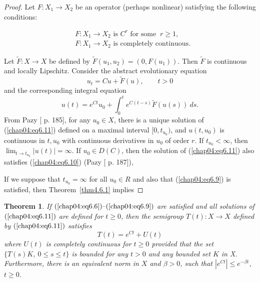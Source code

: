 \documentclass{surv-l}
\theoremstyle{plain}
\newtheorem{theorem}{Theorem}[section]
\theoremstyle{definition}
\numberwithin{equation}{section}
\numberwithin{figure}{chapter}
\begin{document}
\begin{proof}
Let $F\!:X_{1}\rightarrow X_{2}$ be an operator (perhaps nonlinear) satisfying the following conditions:

\begin{align}
\label{chap04:eq6.8}&F:X_{1}\rightarrow X_{2} \text{ is } C^{r} \text{ for some }\ r\geq 1,\\
\label{chap04:eq6.9}
&F:X_{1}\rightarrow X_{2} \text{ is  completely continuous}.
\end{align}

Let $\tilde{F}\!:X\rightarrow X$ be defined by $\tilde{F}(u_{1}, u_{2})=(0, F(u_{1}))$. Then $\tilde{F}$ is continuous and locally Lipschitz. Consider the abstract evolutionary equation
\begin{equation}\label{chap04:eq6.10}
u_{t}=Cu+\tilde{F}(u),\qquad t>0
\end{equation}
and the corresponding integral equation
\begin{equation}\label{chap04:eq6.11}
u(t)=e^{Ct}u_{0}+\int_{0}^{t}e^{C(t-s)}\tilde{F}(u(s))\ ds.
\end{equation}
From Pazy [\citeyear{1983p} p. 185], for any $u_{0}\in X$, there is a unique solution of (\ref{chap04:eq6.11}) defined on a maximal interval $[0, t_{u_{0}})$, and $u(t, u_{0})$ is continuous in $t, u_{0}$ with continuous derivatives in $u_{0}$ of order $r$. If $ t_{u_{0}}<\infty$, then $ \lim_{t\rightarrow t_{u_{0}}}|u(t)|=\infty$. If $u_{0}\in D(C)$, then the solution of (\ref{chap04:eq6.11}) also satisfies (\ref{chap04:eq6.10}) (Pazy [\citeyear{1983p} p. 187]),

If we suppose that $ t_{u_{0}}=\infty$ for all $u_{0}\in R$ and also that (\ref{chap04:eq6.9}) is satisfied, then Theorem~\ref{thm4.6.1} implies
\end{proof}

\begin{theorem}\label{thm4.6.5} If $(\ref{chap04:eq6.6})\text{--}(\ref{chap04:eq6.9})$ are satisfied and all solutions of $(\ref{chap04:eq6.11})$ are
defined for $t\geq 0$, then the semigroup $T(t):X\rightarrow X$ defined by $(\ref{chap04:eq6.11})$ satisfies
\begin{equation*}
T(t)=e^{Ct}+U(t)
\end{equation*}
where $U(t)$ is completely continuous for $t\geq 0$ provided that the set $\{T(s)K,\ 0\leq s\leq t\}$ is bounded for any $t>0$ and any bounded set $K$ in X. Furthermore, there is an equivalent norm in $X$ and $\beta>0$, such that $|e^{Ct}|\leq e^{-\beta t}$, $t\geq 0$.
\end{theorem}
\end{document}
